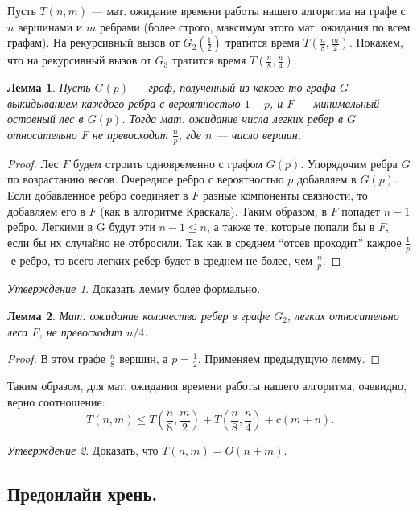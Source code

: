 \documentclass[a4paper]{article}
\theoremstyle{indented}
\newtheorem{lemma}{Лемма}
\theoremstyle{definition}
\theoremstyle{remark}
\newtheorem{stat}{Утверждение}
\begin{document}
Пусть $T(n,m)$ --- мат. ожидание времени работы нашего алгоритма
на графе с $n$ вершинами и $m$ ребрами (более строго, максимум
этого мат. ожидания по всем графам). На рекурсивный вызов от
$G_2(\frac{1}{2})$ тратится время $T(\frac{n}{8},\frac{m}{2})$.
Покажем, что на рекурсивный вызов от $G_3$ тратится время
$T(\frac{n}{8},\frac{n}{4})$. \\ 

\begin{lemma}
Пусть $G(p)$ --- граф, полученный из какого-то графа $G$
выкидыванием каждого ребра с вероятностью $1-p$, и $F$ ---
минимальный остовный лес в $G(p)$. Тогда мат. ожидание числа
легких ребер в $G$ относительно $F$ не превосходит $\frac{n}{p}$,
где $n$ --- число вершин.
\end{lemma}
\begin{proof}
Лес $F$ будем строить одновременно с графом $G(p)$. Упорядочим ребра
$G$ по возрастанию весов. Очередное ребро с вероятностью $p$
добавляем в $G(p)$. Если добавленное ребро соединяет в $F$ разные
компоненты связности, то добавляем его в $F$ (как в алгоритме
Краскала). Таким образом, в $F$ попадет $n-1$ ребро. Легкими
в G будут эти $n-1\leq n$, а также те, которые попали бы в $F$, если
бы их случайно не отбросили. Так как в среднем ``отсев проходит'' каждое
$\frac{1}{p}$-е ребро, то всего легких ребер будет в среднем не
более, чем $\frac{n}{p}$.
\end{proof}
\begin{stat}
Доказать лемму более формально.
\end{stat}

\begin{lemma}
Мат. ожидание количества ребер в графе $G_2$, легких относительно
леса $F$, не превосходит $n/4$.
\end{lemma}
\begin{proof}
В этом графе $\frac{n}{8}$ вершин, а $p=\frac{1}{2}$. Применяем
предыдущую лемму.
\end{proof}
Таким образом, для мат. ожидания времени работы нашего алгоритма,
очевидно, верно соотношение: $$ T(n,m)\leq
T\left(\frac{n}{8},\frac{m}{2}\right)+
T\left(\frac{n}{8},\frac{n}{4}\right)+c(m+n). $$

\begin{stat}
Доказать, что $T(n,m)=O(n+m)$.
\end{stat}

\subsection{Предонлайн хрень.}
\end{document}
